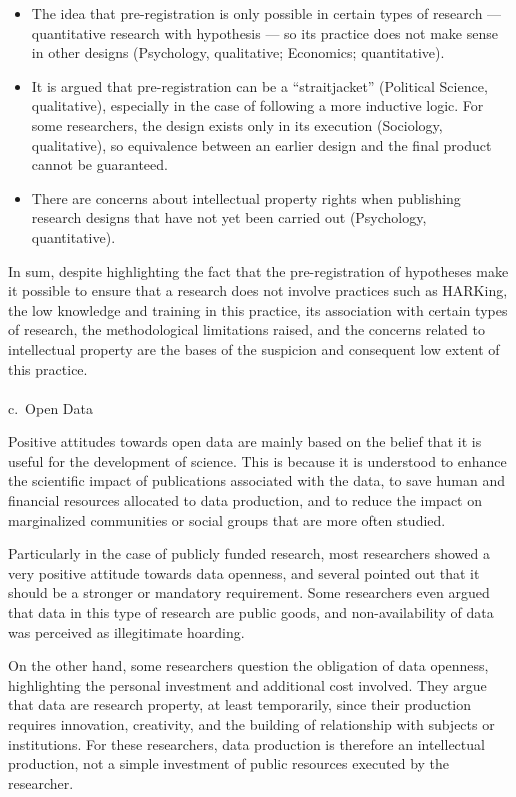 \documentclass[
  letterpaper,
]{article}
\makeatletter
\let\oldparagraph\paragraph
\renewcommand{\paragraph}{
    \@ifstar
      \xxxParagraphStar
      \xxxParagraphNoStar
  }
\newcommand{\xxxParagraphStar}[1]{\oldparagraph*{#1}\mbox{}}
\newcommand{\xxxParagraphNoStar}[1]{\oldparagraph{#1}\mbox{}}
\makeatother
\begin{document}
\begin{itemize}
\item
  The idea that pre-registration is only possible in certain types of
  research --- quantitative research with hypothesis --- so its practice
  does not make sense in other designs (Psychology, qualitative;
  Economics; quantitative).
\item
  It is argued that pre-registration can be a ``straitjacket''
  (Political Science, qualitative), especially in the case of following
  a more inductive logic. For some researchers, the design exists only
  in its execution (Sociology, qualitative), so equivalence between an
  earlier design and the final product cannot be guaranteed.
\item
  There are concerns about intellectual property rights when publishing
  research designs that have not yet been carried out (Psychology,
  quantitative).
\end{itemize}

In sum, despite highlighting the fact that the pre-registration of
hypotheses make it possible to ensure that a research does not involve
practices such as HARKing, the low knowledge and training in this
practice, its association with certain types of research, the
methodological limitations raised, and the concerns related to
intellectual property are the bases of the suspicion and consequent low
extent of this practice.

\paragraph{c.~Open Data}\label{c.-open-data}

Positive attitudes towards open data are mainly based on the belief that
it is useful for the development of science. This is because it is
understood to enhance the scientific impact of publications associated
with the data, to save human and financial resources allocated to data
production, and to reduce the impact on marginalized communities or
social groups that are more often studied.

Particularly in the case of publicly funded research, most researchers
showed a very positive attitude towards data openness, and several
pointed out that it should be a stronger or mandatory requirement. Some
researchers even argued that data in this type of research are public
goods, and non-availability of data was perceived as illegitimate
hoarding.

On the other hand, some researchers question the obligation of data
openness, highlighting the personal investment and additional cost
involved. They argue that data are research property, at least
temporarily, since their production requires innovation, creativity, and
the building of relationship with subjects or institutions. For these
researchers, data production is therefore an intellectual production,
not a simple investment of public resources executed by the researcher.
\end{document}

